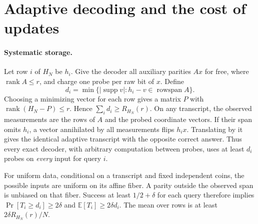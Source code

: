 \documentclass[11pt]{article}
\theoremstyle{definition}
\theoremstyle{remark}
\newcommand{\supp}{\operatorname{supp}}
\newcommand{\rk}{\operatorname{rank}}
\begin{document}
\section{Adaptive decoding and the cost of updates}\label{sec:dynamic}
\paragraph{Systematic storage.}
Let row $i$ of $H_N$ be $h_i$. Give the decoder all auxiliary parities
$Ax$ for free, where $\rk A\le r$, and charge one probe per raw bit of
$x$. Define
\[
 d_i=\min\{|\supp v|:h_i-v\in\operatorname{rowspan} A\}.
\]
Choosing a minimizing vector for each row gives a matrix $P$ with
$\rk(H_N-P)\le r$. Hence $\sum_i d_i\ge R_{H_N}(r)$.
On any transcript, the observed measurements are the rows of $A$
and the probed coordinate vectors. If their span omits $h_i$, a vector
annihilated by all measurements flips $h_ix$. Translating by it gives
the identical adaptive transcript with the opposite correct answer.
Thus every exact decoder, with arbitrary computation between probes,
uses at least $d_i$ probes on \emph{every} input for query $i$.

For uniform data, conditional on a transcript and fixed independent
coins, the possible inputs are uniform on its affine fiber. A parity
outside the observed span is unbiased on that fiber. Success at least
$1/2+\delta$ for each query therefore implies
$\Pr[T_i\ge d_i]\ge2\delta$ and $\mathbb E[T_i]\ge2\delta d_i$.
The mean over rows is at least $2\delta R_{H_N}(r)/N$.
\end{document}
